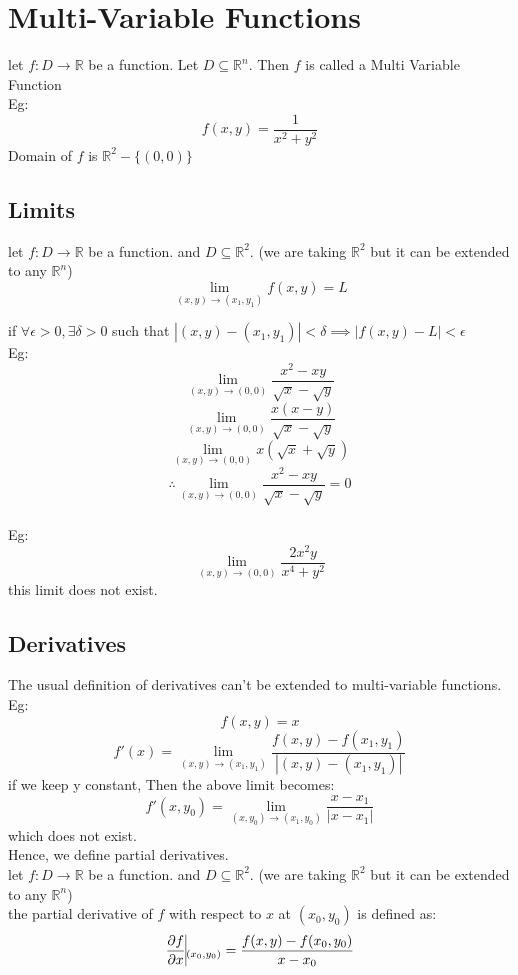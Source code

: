 \documentclass{article}
\begin{document}
\section{Multi-Variable Functions}
let $f: D \rightarrow \mathbb{R}$ be a function. Let $D\subseteq \mathbb{R}^n$. Then $f$ is called a Multi Variable Function\\
Eg: \[f(x,y) = \frac{1}{x^2 + y^2}\]
Domain of $f$ is $\mathbb{R}^2 - \{(0,0)\}$

\subsection{Limits}
let $f: D \rightarrow \mathbb{R}$ be a function. and $D\subseteq \mathbb{R}^2$. (we are taking $\mathbb{R}^2$ but it can be extended to any $\mathbb{R}^n$)\\

\[ \lim_{(x,y)\rightarrow (x_1, y_1)} f(x,y) = L\]

if $\forall \epsilon > 0, \exists \delta > 0$ such that $|(x,y) - (x_1, y_1)| < \delta \implies |f(x,y) - L| < \epsilon$
\\
Eg: \[ \lim_{(x,y)\rightarrow (0,0)} \frac{x^2 - xy}{\sqrt{x} - \sqrt{y}}\]
\[ \lim_{(x,y)\rightarrow (0,0)} \frac{x(x-y)}{\sqrt{x} - \sqrt{y}}\]
\[ \lim_{(x,y)\rightarrow (0,0)} x(\sqrt{x} + \sqrt{y})\]
\[ \therefore \lim_{(x,y)\rightarrow (0,0)} \frac{x^2 - xy}{\sqrt{x} - \sqrt{y}} = 0 \]
\\
Eg: \[ \lim_{(x,y)\rightarrow (0,0)} \frac{2x^2y}{x^4 + y^2}\]
this limit does not exist.\\

\subsection{Derivatives}
The usual definition of derivatives can't be extended to multi-variable functions.\\
Eg: \[ f(x,y) = x \]
\[ f'(x) = \lim_{(x,y)\rightarrow (x_1, y_1)} \frac{f(x,y) - f(x_1, y_1)}{|(x,y) - (x_1, y_1)|} \]
if we keep y constant, Then the above limit becomes:
\[ f'(x,y_0) = \lim_{(x,y_0)\rightarrow (x_1, y_0)} \frac{x - x_1}{|x - x_1|} \]
which does not exist.\\

Hence, we define partial derivatives.\\
let $f: D \rightarrow \mathbb{R}$ be a function. and $D\subseteq \mathbb{R}^2$. (we are taking $\mathbb{R}^2$ but it can be extended to any $\mathbb{R}^n$)\\
the partial derivative of $f$ with respect to $x$ at $(x_0, y_0)$ is defined as:
\[ \frac{\partial f}{\partial x} \vline_{(x_0, y_0)} = \frac{f(x,y) - f(x_0, y_0)}{x - x_0}\]
\end{document}
